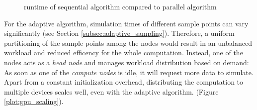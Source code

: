 \begin{figure}[H]
  \centerline{
    }
  \caption{runtime of sequential algorithm compared to parallel algorithm}
  \label{plot:runtime}
\end{figure}
For the adaptive algorithm, simulation times of different sample points can vary
significantly (see Section \ref{subsec:adaptive_sampling}). Therefore, a uniform
partitioning of the sample points among the nodes would result in an unbalanced
workload and reduced efficency for the whole computation. Instead, one of the
nodes acts as a \emph{head node} and manages workload distribution based on demand: As
soon as one of the \emph{compute nodes} is idle, it will request more data to simulate.
Apart from a constant initialization overhead, distributing the computation to
multiple devices scales well, even with the adaptive algorithm. (Figure
\ref{plot:gpu_scaling}).
